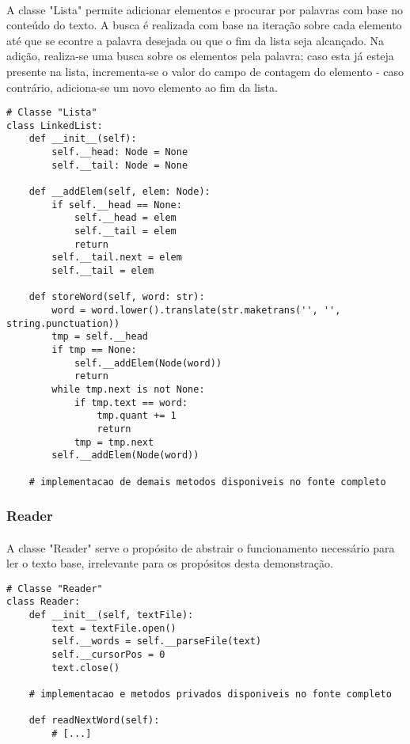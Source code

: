 \documentclass[12pt, letterpaper]{article}
\begin{document}
\paragraph{}
A classe "Lista" permite adicionar elementos e procurar por palavras com base no conteúdo
do texto. A busca é realizada com base na iteração sobre cada elemento até que se econtre
a palavra desejada ou que o fim da lista seja alcançado. Na adição, realiza-se uma busca
sobre os elementos pela palavra; caso esta já esteja presente na lista, incrementa-se o
valor do campo de contagem do elemento - caso contrário, adiciona-se um novo elemento ao
fim da lista.
\begin{lstlisting}
# Classe "Lista"
class LinkedList:
    def __init__(self):
        self.__head: Node = None
        self.__tail: Node = None

    def __addElem(self, elem: Node):
        if self.__head == None:
            self.__head = elem
            self.__tail = elem
            return
        self.__tail.next = elem
        self.__tail = elem

    def storeWord(self, word: str):
        word = word.lower().translate(str.maketrans('', '', string.punctuation))
        tmp = self.__head
        if tmp == None:
            self.__addElem(Node(word))
            return
        while tmp.next is not None:
            if tmp.text == word:
                tmp.quant += 1
                return
            tmp = tmp.next
        self.__addElem(Node(word))

    # implementacao de demais metodos disponiveis no fonte completo
\end{lstlisting}

\subsubsection{Reader}
\paragraph{}
A classe "Reader" serve o propósito de abstrair o funcionamento necessário para ler o
texto base, irrelevante para os propósitos desta demonstração.
\begin{lstlisting}
# Classe "Reader"
class Reader:
    def __init__(self, textFile):
        text = textFile.open()
        self.__words = self.__parseFile(text)
        self.__cursorPos = 0
        text.close()

    # implementacao e metodos privados disponiveis no fonte completo

    def readNextWord(self):
        # [...]
\end{lstlisting}
\end{document}
